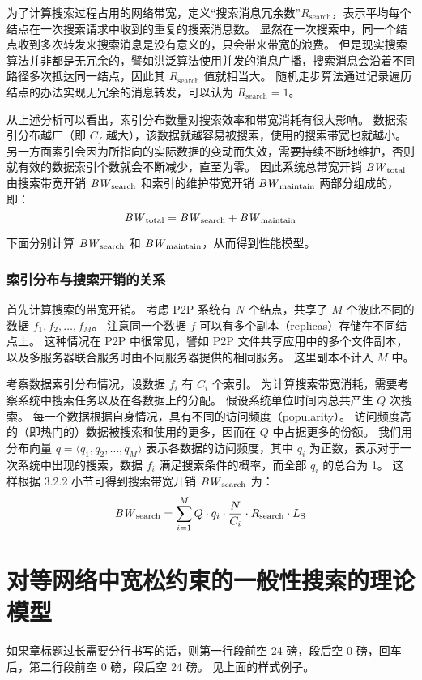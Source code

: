 \documentclass[degree=doctor]{thuthesis}
\begin{document}
为了计算搜索过程占用的网络带宽，定义“搜索消息冗余数”$R_{\text{search}}$，表示平均每个结点在一次搜索请求中收到的重复的搜索消息数。
显然在一次搜索中，同一个结点收到多次转发来搜索消息是没有意义的，只会带来带宽的浪费。
但是现实搜索算法并非都是无冗余的，譬如洪泛算法使用并发的消息广播，搜索消息会沿着不同路径多次抵达同一结点，因此其 $R_{\text{search}}$ 值就相当大。
随机走步算法通过记录遍历结点的办法实现无冗余的消息转发，可以认为 $R_{\text{search}} = 1$。

从上述分析可以看出，索引分布数量对搜索效率和带宽消耗有很大影响。
数据索引分布越广（即 $C_f$ 越大），该数据就越容易被搜索，使用的搜索带宽也就越小。
另一方面索引会因为所指向的实际数据的变动而失效，需要持续不断地维护，否则就有效的数据索引个数就会不断减少，直至为零。
因此系统总带宽开销 $\mathit{BW}_{\text{total}}$ 由搜索带宽开销 $\mathit{BW}_{\text{search}}$ 和索引的维护带宽开销 $\mathit{BW}_{\text{maintain}}$ 两部分组成的，即：
\begin{equation}
  \mathit{BW}_{\text{total}} = \mathit{BW}_{\text{search}} + \mathit{BW}_{\text{maintain}}
\end{equation}

下面分别计算 $\mathit{BW}_{\text{search}}$ 和 $\mathit{BW}_{\text{maintain}}$，从而得到性能模型。


\subsection{索引分布与搜索开销的关系}

首先计算搜索的带宽开销。
考虑 P2P 系统有 $N$ 个结点，共享了 $M$ 个彼此不同的数据 $f_1, f_2, \dots, f_M$。
注意同一个数据 $f$ 可以有多个副本（replicas）存储在不同结点上。
这种情况在 P2P 中很常见，譬如 P2P 文件共享应用中的多个文件副本，以及多服务器联合服务时由不同服务器提供的相同服务。
这里副本不计入 $M$ 中。

考察数据索引分布情况，设数据 $f_i$ 有 $C_i$ 个索引。
为计算搜索带宽消耗，需要考察系统中搜索任务以及在各数据上的分配。
假设系统单位时间内总共产生 $Q$ 次搜索。
每一个数据根据自身情况，具有不同的访问频度（popularity）。
访问频度高的（即热门的）数据被搜索和使用的更多，因而在 $Q$ 中占据更多的份额。
我们用分布向量 $q = \langle q_1, q_2 , \dots, q_M \rangle$ 表示各数据的访问频度，其中 $q_i$ 为正数，表示对于一次系统中出现的搜索，数据 $f_i$ 满足搜索条件的概率，而全部 $q_i$ 的总合为 1。
这样根据 3.2.2 小节可得到搜索带宽开销 $\mathit{BW}_{\text{search}}$ 为：
\begin{equation}
  \mathit{BW}_{\text{search}} = \sum_{i=1}^M Q \cdot q_i \cdot \frac{N}{C_i} \cdot R_{\text{search}} \cdot L_{\text{S}}
\end{equation}




\chapter{对等网络中宽松约束的一般性搜索的理论模型}

如果章标题过长需要分行书写的话，则第一行段前空 24 磅，段后空 0 磅，回车后，第二行段前空 0 磅，段后空 24 磅。
见上面的样式例子。



\clearpage
\OMIT
\end{document}
